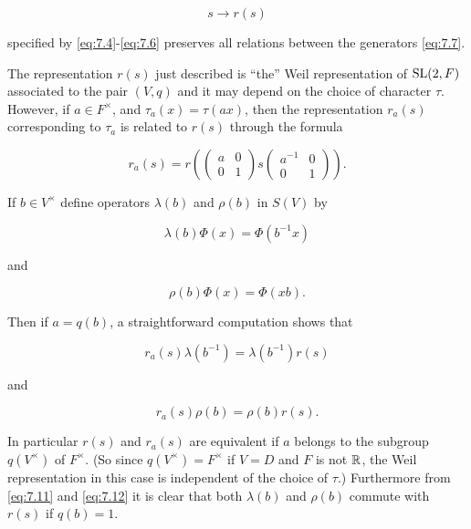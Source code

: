 \[
s \to r(s)
\]

specified by \eqref{eq:7.4}-\eqref{eq:7.6} preserves all relations between the generators \eqref{eq:7.7}.

The representation $r(s)$ just described is ``the'' Weil representation of $\operatorname{SL}(2,F)$ associated to the pair $(V,q)$ and it may depend on the choice of character $\tau$. However, if $a \in F^{\times}$, and $\tau_a(x) = \tau(ax)$, then the representation $r_a(s)$ corresponding to $\tau_a$ is related to $r(s)$ through the formula

\begin{equation}\label{eq:7.8}
r_a(s) = r\left(\begin{pmatrix} a & 0 \\ 0 & 1 \end{pmatrix} s \begin{pmatrix} a^{-1} & 0 \\ 0 & 1 \end{pmatrix}\right).\tag{7.8}
\end{equation}

If $b \in V^{\times}$ define operators $\lambda(b)$ and $\rho(b)$ in $S(V)$ by

\begin{equation}\label{eq:7.9}
\lambda(b)\Phi(x) = \Phi(b^{-1}x)\tag{7.9}
\end{equation}

and

\begin{equation}\label{eq:7.10}
\rho(b)\Phi(x) = \Phi(xb).\tag{7.10}
\end{equation}

Then if $a = q(b)$, a straightforward computation shows that

\begin{equation}\label{eq:7.11}
r_a(s)\lambda(b^{-1}) = \lambda(b^{-1})r(s)\tag{7.11}
\end{equation}

and

\begin{equation}\label{eq:7.12}
r_a(s)\rho(b) = \rho(b)r(s).\tag{7.12}
\end{equation}

In particular $r(s)$ and $r_a(s)$ are equivalent if $a$ belongs to the subgroup $q(V^{\times})$ of $F^{\times}$. (So since $q(V^{\times}) = F^{\times}$ if $V = D$ and $F$ is not $\mathbb{R}$, the Weil representation in this case is independent of the choice of $\tau$.) Furthermore from \eqref{eq:7.11} and \eqref{eq:7.12} it is clear that both $\lambda(b)$ and $\rho(b)$ commute with $r(s)$ if $q(b) = 1$.

